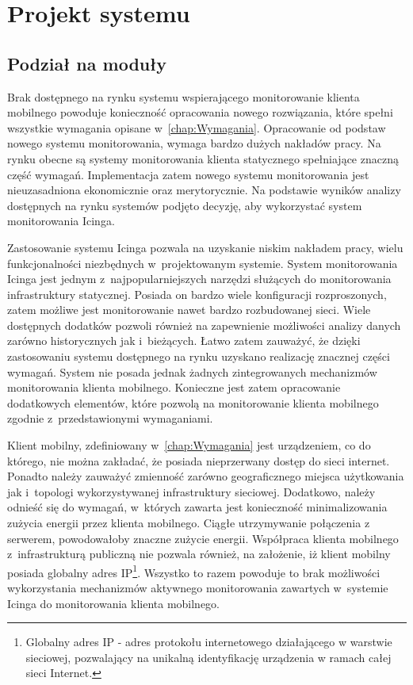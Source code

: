 \chapter{Projekt systemu}
\label{chap:ProjektSystemu}

\section[Podział na moduły][Podział na moduły]{Podział na moduły}

Brak dostępnego na rynku systemu wspierającego monitorowanie klienta
mobilnego powoduje konieczność opracowania nowego rozwiązania, które
spełni wszystkie wymagania opisane w~\ref{chap:Wymagania}. Opracowanie
od podstaw nowego systemu monitorowania, wymaga bardzo dużych nakładów
pracy. Na rynku obecne są systemy monitorowania klienta statycznego
spełniające znaczną część wymagań. Implementacja zatem nowego systemu
monitorowania jest nieuzasadniona ekonomicznie oraz merytorycznie. Na
podstawie wyników analizy dostępnych na rynku systemów podjęto
decyzję, aby wykorzystać system monitorowania Icinga.

Zastosowanie systemu Icinga pozwala na uzyskanie niskim nakładem
pracy, wielu funkcjonalności niezbędnych w~projektowanym
systemie. System monitorowania Icinga jest jednym
z~najpopularniejszych narzędzi służących do monitorowania
infrastruktury statycznej. Posiada on bardzo wiele konfiguracji
rozproszonych, zatem możliwe jest monitorowanie nawet bardzo
rozbudowanej sieci. Wiele dostępnych dodatków pozwoli również na
zapewnienie możliwości analizy danych zarówno historycznych jak
i~bieżących. Łatwo zatem zauważyć, że dzięki zastosowaniu systemu
dostępnego na rynku uzyskano realizację znacznej części
wymagań. System nie posada jednak żadnych zintegrowanych mechanizmów
monitorowania klienta mobilnego. Konieczne jest zatem opracowanie
dodatkowych elementów, które pozwolą na monitorowanie klienta
mobilnego zgodnie z~przedstawionymi wymaganiami.

Klient mobilny, zdefiniowany w~\ref{chap:Wymagania} jest urządzeniem,
co do którego, nie można zakładać, że posiada nieprzerwany dostęp do
sieci internet. Ponadto należy zauważyć zmienność zarówno
geograficznego miejsca użytkowania jak i~topologi wykorzystywanej
infrastruktury sieciowej. Dodatkowo, należy odnieść się do wymagań,
w~których zawarta jest konieczność minimalizowania zużycia energii
przez klienta mobilnego. Ciągłe utrzymywanie połączenia z serwerem,
powodowałoby znaczne zużycie energii. Współpraca klienta mobilnego
z~infrastrukturą publiczną nie pozwala również, na założenie, iż
klient mobilny posiada globalny adres IP\footnote{Globalny adres IP -
  adres protokołu internetowego działającego w warstwie sieciowej,
  pozwalający na unikalną identyfikację urządzenia w ramach całej
  sieci Internet.}. Wszystko to razem powoduje to brak możliwości
wykorzystania mechanizmów aktywnego monitorowania zawartych w~systemie
Icinga do monitorowania klienta mobilnego.

